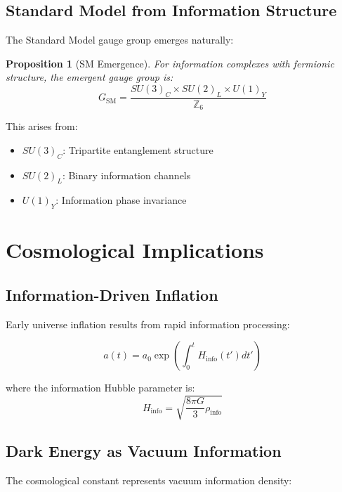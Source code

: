 \documentclass[12pt]{article}
\newtheorem{proposition}[theorem]{Proposition}
\begin{document}
\subsection{Standard Model from Information Structure}

The Standard Model gauge group emerges naturally:

\begin{proposition}[SM Emergence]
For information complexes with fermionic structure, the emergent gauge group is:
\begin{equation}
G_{\text{SM}} = \frac{SU(3)_C \times SU(2)_L \times U(1)_Y}{\mathbb{Z}_6}
\end{equation}
\end{proposition}

This arises from:
\begin{itemize}
\item $SU(3)_C$: Tripartite entanglement structure
\item $SU(2)_L$: Binary information channels
\item $U(1)_Y$: Information phase invariance
\end{itemize}

\section{Cosmological Implications}

\subsection{Information-Driven Inflation}

Early universe inflation results from rapid information processing:

\begin{equation}
a(t) = a_0 \exp\left(\int_0^t H_{\text{info}}(t') dt'\right)
\end{equation}

where the information Hubble parameter is:
\begin{equation}
H_{\text{info}} = \sqrt{\frac{8\pi G}{3}\rho_{\text{info}}}
\end{equation}

\subsection{Dark Energy as Vacuum Information}

The cosmological constant represents vacuum information density:
\end{document}
